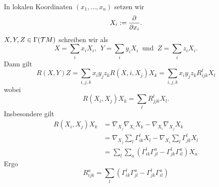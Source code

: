 In lokalen Koordinaten $(x_1, \ldots, x_n)$ setzen wir
\[ X_i := \frac{\partial }{\partial x_i}. \]
$X,Y,Z \in \Gamma(\mathcal{T} M)$ schreiben wir als
\[ X = \sum_i x_i X_i,~~ Y = \sum_i y_i X_i~ \text{ und }~ Z = \sum_i z_i X_i. \]
Dann gilt
\[ R(X,Y)Z = \sum_{i,j,k} x_i y_j z_k R(X,i,X_j)X_k = \sum_{i,j,k} x_i y_j z_k R^l_{ijk} X_l \]
wobei
\[ R(X_i,X_j)X_k = \sum_l R_{jjk}^l X_l. \]
Insbesondere gilt
\begin{align*}
R(X_i, X_j)X_k &= \nabla_{X_j} \nabla_{X_i} X_k - \nabla_{X_i} \nabla_{X_j} X_k\\
&= \nabla_{X_j} \sum_l \Gamma_{ik}^l X_l - \nabla_{X_i} \sum_l \Gamma_{jk}^l X_l\\
&= \sum_l \sum_a (\Gamma_{ik}^l \Gamma_{jl}^a  - \Gamma_{jk}^l \Gamma_{il}^a)X_a
\end{align*}
Ergo
\[ R_{ijk}^a = \sum_l (\Gamma_{ik}^l \Gamma_{jl}^a  - \Gamma_{jk}^l \Gamma_{il}^a) \]
